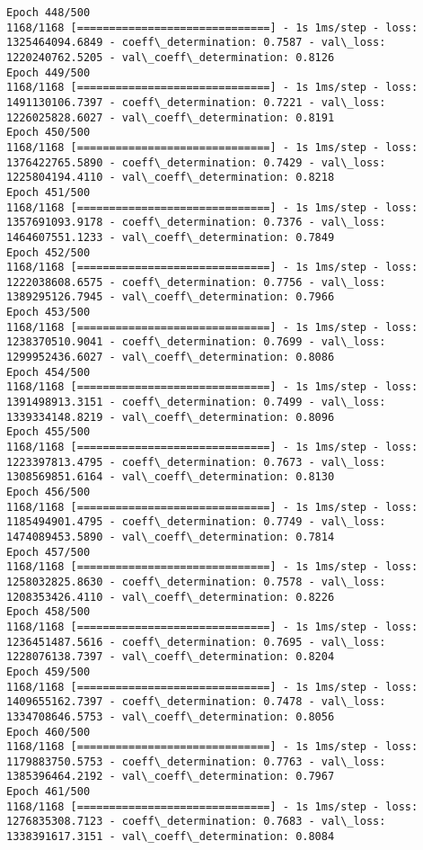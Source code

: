 \documentclass[11pt]{article}
\begin{document}
\begin{Verbatim}[commandchars=\\\{\}]
Epoch 448/500
1168/1168 [==============================] - 1s 1ms/step - loss: 1325464094.6849 - coeff\_determination: 0.7587 - val\_loss: 1220240762.5205 - val\_coeff\_determination: 0.8126
Epoch 449/500
1168/1168 [==============================] - 1s 1ms/step - loss: 1491130106.7397 - coeff\_determination: 0.7221 - val\_loss: 1226025828.6027 - val\_coeff\_determination: 0.8191
Epoch 450/500
1168/1168 [==============================] - 1s 1ms/step - loss: 1376422765.5890 - coeff\_determination: 0.7429 - val\_loss: 1225804194.4110 - val\_coeff\_determination: 0.8218
Epoch 451/500
1168/1168 [==============================] - 1s 1ms/step - loss: 1357691093.9178 - coeff\_determination: 0.7376 - val\_loss: 1464607551.1233 - val\_coeff\_determination: 0.7849
Epoch 452/500
1168/1168 [==============================] - 1s 1ms/step - loss: 1222038608.6575 - coeff\_determination: 0.7756 - val\_loss: 1389295126.7945 - val\_coeff\_determination: 0.7966
Epoch 453/500
1168/1168 [==============================] - 1s 1ms/step - loss: 1238370510.9041 - coeff\_determination: 0.7699 - val\_loss: 1299952436.6027 - val\_coeff\_determination: 0.8086
Epoch 454/500
1168/1168 [==============================] - 1s 1ms/step - loss: 1391498913.3151 - coeff\_determination: 0.7499 - val\_loss: 1339334148.8219 - val\_coeff\_determination: 0.8096
Epoch 455/500
1168/1168 [==============================] - 1s 1ms/step - loss: 1223397813.4795 - coeff\_determination: 0.7673 - val\_loss: 1308569851.6164 - val\_coeff\_determination: 0.8130
Epoch 456/500
1168/1168 [==============================] - 1s 1ms/step - loss: 1185494901.4795 - coeff\_determination: 0.7749 - val\_loss: 1474089453.5890 - val\_coeff\_determination: 0.7814
Epoch 457/500
1168/1168 [==============================] - 1s 1ms/step - loss: 1258032825.8630 - coeff\_determination: 0.7578 - val\_loss: 1208353426.4110 - val\_coeff\_determination: 0.8226
Epoch 458/500
1168/1168 [==============================] - 1s 1ms/step - loss: 1236451487.5616 - coeff\_determination: 0.7695 - val\_loss: 1228076138.7397 - val\_coeff\_determination: 0.8204
Epoch 459/500
1168/1168 [==============================] - 1s 1ms/step - loss: 1409655162.7397 - coeff\_determination: 0.7478 - val\_loss: 1334708646.5753 - val\_coeff\_determination: 0.8056
Epoch 460/500
1168/1168 [==============================] - 1s 1ms/step - loss: 1179883750.5753 - coeff\_determination: 0.7763 - val\_loss: 1385396464.2192 - val\_coeff\_determination: 0.7967
Epoch 461/500
1168/1168 [==============================] - 1s 1ms/step - loss: 1276835308.7123 - coeff\_determination: 0.7683 - val\_loss: 1338391617.3151 - val\_coeff\_determination: 0.8084

\end{Verbatim}
\end{document}
